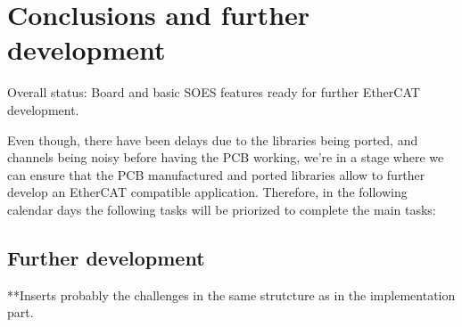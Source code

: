 \chapter{Conclusions and further development}\label{cha:conclusions}

Overall status: Board and basic SOES features ready for further EtherCAT development.

Even though, there have been delays due to the libraries being ported, and channels being noisy before having the PCB working, we're in a stage where we can ensure that the PCB manufactured and ported libraries allow to further develop an EtherCAT compatible application. Therefore, in the following calendar days the following tasks will be priorized to complete the main tasks:

\section{Further development}\label{sec:improve}

**Inserts probably the challenges in the same strutcture as in the implementation part.
